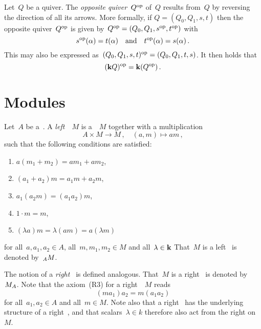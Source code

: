 \begin{example}
  Let~$Q$ be a quiver.
  The \emph{opposite quiver}~$Q^{\mathrm{op}}$ of~$Q$ results from~$Q$ by reversing the direction of all its arrows.
  More formally, if $Q = (Q_0, Q_1, s, t)$ then the opposite quiver~$Q^{\mathrm{op}}$ is given by~$Q^{\mathrm{op}} = (Q_0, Q_1, s^{\mathrm{op}}, t^{\mathrm{op}})$ with
  \[
      s^{\mathrm{op}}(\alpha)
    = t(\alpha)
    \quad\text{and}\quad
      t^{\mathrm{op}}(\alpha)
    = s(\alpha) \,.
  \]
  This may also be expressed as~$(Q_0, Q_1, s, t)^{\mathrm{op}} = (Q_0, Q_1, t, s)$.
  It then holds that
  \[
    (\mathbf{k} Q)^{\mathrm{op}} = \mathbf{k} (Q^{\mathrm{op}}) \,.
  \]
\end{example}





\section{Modules}


\begin{definition}
  Let~$A$ be a~{\kalg}.
  A \emph{left~{}}~$M$ is a~{\module{$\kf$}}~$M$ together with a multiplication
  \[
            A \times M
    \to     M \,,
    \quad   (a,m)
    \mapsto am \,,
  \]
  such that the following conditions are satisfied:
  \begin{enumerate}[label={(L\arabic*})]
    \item
      $a(m_1 + m_2) = am_1 + am_2$,
    \item
      $(a_1 + a_2) m = a_1 m + a_2 m$,
    \item
      \label{module associative}
      $a_1 (a_2 m) = (a_1 a_2) m$,
    \item
      $1 \cdot m = m$,
    \item
      $(\lambda a)m = \lambda (am) = a (\lambda m)$
  \end{enumerate}
  for all~$a, a_1, a_2 \in A$, all~$m, m_1, m_2 \in M$ and all~$\lambda \in \mathbf{k}$
  That~$M$ is a left~{} is denoted by~$\indmodule[A]{M}$.
  
  The notion of a \emph{right~{}} is defined analogous.
  That~$M$ is a right~{} is denoted by~$\indmodule{M}[A]$.
  Note that the axiom~(R3) for a right~{}~$M$ reads
  \[
      (m a_1) a_2
    = m (a_1 a_2)
  \]
  for all~$a_1, a_2 \in A$ and all~$m \in M$.
  Note also that a right~{} has the underlying structure of a right~{\module{$\kf$}}, and that scalars~$\lambda \in k$ therefore also act from the right on~$M$.
\end{definition}


